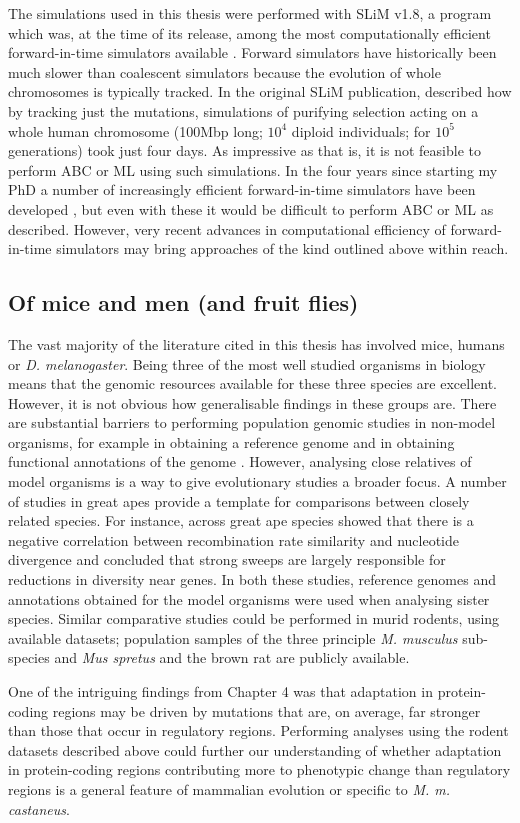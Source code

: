 	The simulations used in this thesis were performed with SLiM v1.8, a program which was, at the time of its release, among the most computationally efficient forward-in-time simulators available \citep{RN148}. Forward simulators have historically been much slower than coalescent simulators because the evolution of whole chromosomes is typically tracked. In the original SLiM publication, \cite{RN148} described how by tracking just the mutations, simulations of purifying selection acting on a whole human chromosome (100Mbp long; $10^4$ diploid individuals; for $10^5$ generations) took just four days. As impressive as that is, it is not feasible to perform ABC or ML using such simulations. In the four years since starting my PhD a number of increasingly efficient forward-in-time simulators have been developed \citep{RN361, RN362, RN360}, but even with these it would be difficult to perform ABC or ML as described. However, very recent advances in computational efficiency of forward-in-time simulators \citep{RN359} may bring approaches of the kind outlined above within reach.

\subsection{Of mice and men (and fruit flies)}

	The vast majority of the literature cited in this thesis has involved mice, humans or \textit{D. melanogaster}. Being three of the most well studied organisms in biology means that the genomic resources available for these three species are excellent. However, it is not obvious how generalisable findings in these groups are. There are substantial barriers to performing population genomic studies in non-model organisms, for example in obtaining a reference genome and in obtaining functional annotations of the genome \citep{RN382}. However, analysing close relatives of model organisms is a way to give evolutionary studies a broader focus. A number of studies in great apes provide a template for comparisons between closely related species. For instance, across great ape species \cite{RN221} showed that there is a negative correlation between recombination rate similarity and nucleotide divergence and \cite{RN365} concluded that strong sweeps are largely responsible for reductions in diversity near genes. In both these studies, reference genomes and annotations obtained for the model organisms were used when analysing sister species. Similar comparative studies could be performed in murid rodents, using available datasets; population samples of the three principle \textit{M. musculus} sub-species and \textit{Mus spretus} \citep{RN383} and the brown rat \citep{RN327} are publicly available. 

	One of the intriguing findings from Chapter 4 was that adaptation in protein-coding regions may be driven by mutations that are, on average, far stronger than those that occur in regulatory regions. Performing analyses using the rodent datasets described above could further our understanding of whether adaptation in protein-coding regions contributing more to phenotypic change than regulatory regions is a general feature of mammalian evolution or specific to \textit{M. m. castaneus}.